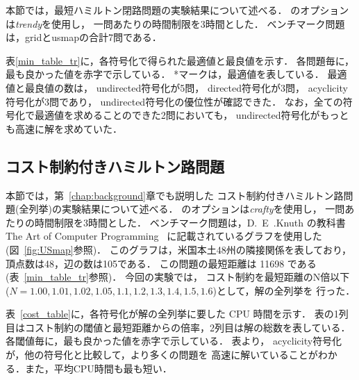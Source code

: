 
本節では，最短ハミルトン閉路問題の実験結果について述べる．
{\clingo}のオプションは\textit{trendy}を使用し，
一問あたりの時間制限を3時間とした．
ベンチマーク問題は，\textsf{grid}と\textsf{usmap}の合計7問である．

表\ref{min_table_tr}に，各符号化で得られた最適値と最良値を示す．
各問題毎に，最も良かった値を赤字で示している．
*マークは，最適値を表している．
最適値と最良値の数は，
\textsf{undirected}符号化が5問，
\textsf{directed}符号化が3問，
\textsf{acyclicity}符号化が3問であり，
\textsf{undirected}符号化の優位性が確認できた．
なお，全ての符号化で最適値を求めることのできた2問においても，
\textsf{undirected}符号化がもっとも高速に解を求めていた．

\subsection{コスト制約付きハミルトン路問題}


本節では，第~\ref{chap:background}章でも説明した
コスト制約付きハミルトン路問題(全列挙)の実験結果について述べる．
{\clingo}のオプションは\textit{crafty}を使用し，
一問あたりの時間制限を3時間とした．
ベンチマーク問題は，D.~E~.Knuth の教科書
The Art of Computer Programming~\cite{Knuth:TAOCP:SAT}
に記載されているグラフを使用した(図~\ref{fig:USmap}参照)．
このグラフは，米国本土48州の隣接関係を表しており，
頂点数は48，辺の数は105である．
この問題の最短距離は 11698 である(表~\ref{min_table_tr}参照)．
今回の実験では，
コスト制約を最短距離のN倍以下
($N=1.00,1.01,1.02,1.05,1.1,1.2,1.3,1.4,1.5,1.6$)として，解の全列挙を
行った．

表~\ref{cost_table}に，各符号化が解の全列挙に要した CPU 時間を示す．
表の1列目はコスト制約の閾値と最短距離からの倍率，2列目は解の総数を表している．
各閾値毎に，最も良かった値を赤字で示している．
表より，
\textsf{acyclicity}符号化が，他の符号化と比較して，より多くの問題を
高速に解いていることがわかる．また，平均CPU時間も最も短い．

